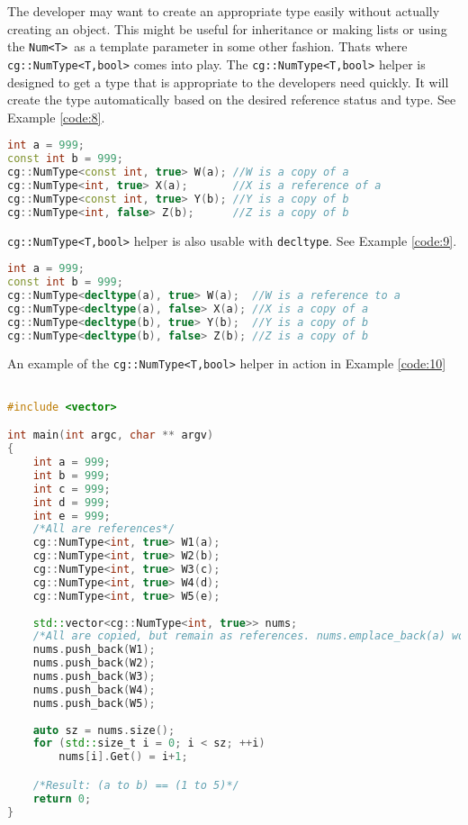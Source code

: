 \documentclass{article}
\newcommand{\theobj}{\protect\Verb+Num<T> +}
\begin{document}
The developer may want to create an appropriate type easily without actually creating an object. This might be useful for inheritance or making lists or using the \theobj as a template parameter in some other fashion. Thats where \protect\Verb+cg::NumType<T,bool>+ comes into play.  The \protect\Verb+cg::NumType<T,bool>+ helper is designed to get a type that is appropriate to the developers need quickly.  It will create the type automatically based on the desired reference status and type. See Example \vref{code:8}.

\begin{lstlisting}[language=C++, label=code:8, caption=NumType Helper]
int a = 999;
const int b = 999;
cg::NumType<const int, true> W(a); //W is a copy of a
cg::NumType<int, true> X(a);       //X is a reference of a
cg::NumType<const int, true> Y(b); //Y is a copy of b
cg::NumType<int, false> Z(b);      //Z is a copy of b
\end{lstlisting}

\Verb+cg::NumType<T,bool>+ helper is also usable with \Verb+decltype+. See Example \vref{code:9}.
\pagebreak
\begin{lstlisting}[language=C++, label=code:9, caption=NumType Helper and decltype]
int a = 999;
const int b = 999;
cg::NumType<decltype(a), true> W(a);  //W is a reference to a
cg::NumType<decltype(a), false> X(a); //X is a copy of a
cg::NumType<decltype(b), true> Y(b);  //Y is a copy of b
cg::NumType<decltype(b), false> Z(b); //Z is a copy of b
\end{lstlisting}
An example of the \Verb+cg::NumType<T,bool>+ helper in action in Example \vref{code:10}

\begin{lstlisting}[language=C++, label=code:10, caption=NumType Helper Useful Use]

#include <vector>

int main(int argc, char ** argv)
{
	int a = 999;
	int b = 999;
	int c = 999;
	int d = 999;
	int e = 999;
	/*All are references*/
	cg::NumType<int, true> W1(a); 
	cg::NumType<int, true> W2(b); 
	cg::NumType<int, true> W3(c); 
	cg::NumType<int, true> W4(d); 
	cg::NumType<int, true> W5(e); 
	
	std::vector<cg::NumType<int, true>> nums;
	/*All are copied, but remain as references. nums.emplace_back(a) would work as well.*/
	nums.push_back(W1);
	nums.push_back(W2);
	nums.push_back(W3);
	nums.push_back(W4);
	nums.push_back(W5);
	
	auto sz = nums.size();
	for (std::size_t i = 0; i < sz; ++i)
		nums[i].Get() = i+1;

	/*Result: (a to b) == (1 to 5)*/
	return 0;
}
\end{lstlisting}
\pagebreak
\end{document}
